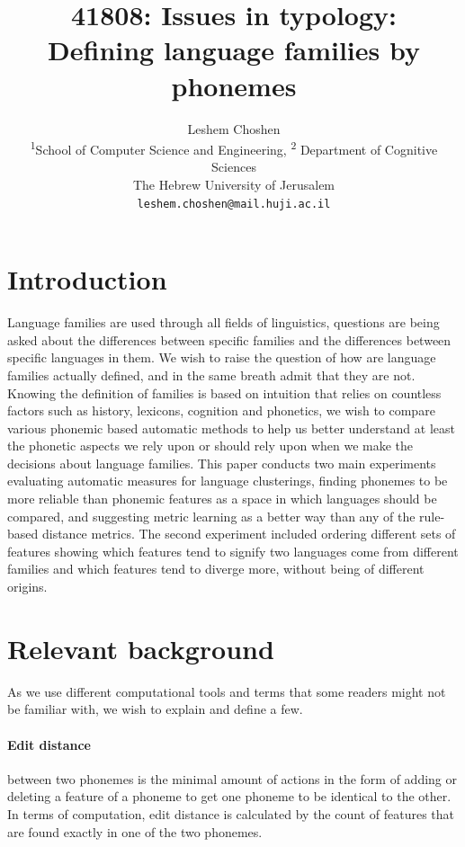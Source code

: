 \documentclass[letterpaper, 11pt]{article}
\begin{document}
\title{41808: Issues in typology:\\Defining language families by phonemes}
\author{
  Leshem Choshen \\
  \textsuperscript{1}School of Computer Science and Engineering,
  \textsuperscript{2} Department of Cognitive Sciences \\
  The Hebrew University of Jerusalem \\
  \texttt{leshem.choshen@mail.huji.ac.il}\\
}
\maketitle
\section{Introduction}
Language families are used through all fields of linguistics, questions are being asked about the differences between specific families and the differences between specific languages in them. We wish to raise the question of how are language families actually defined, and in the same breath admit that they are not. Knowing the definition of families is based on intuition that relies on countless factors such as history, lexicons, cognition and phonetics, we wish to compare various phonemic based automatic methods to help us better understand at least the phonetic aspects we rely upon or should rely upon when we make the decisions about language families. This paper conducts two main experiments evaluating automatic measures for language clusterings, finding phonemes to be more reliable than phonemic features as a space in which languages should be compared, and suggesting metric learning as a better way than any of the rule-based distance metrics. The second experiment included ordering different sets of features showing which features tend to signify two languages come from different families and which features tend to diverge more, without being of different origins.
\section{Relevant background}
As we use different computational tools and terms that some readers might not be familiar with, we wish to explain and define a few.
\paragraph{Edit distance} between two phonemes is the minimal amount of actions in the form of adding or deleting a feature of a phoneme to get one phoneme to be identical to the other. In terms of computation, edit distance is calculated by the count of features that are found exactly in one of the two phonemes.
\end{document}
